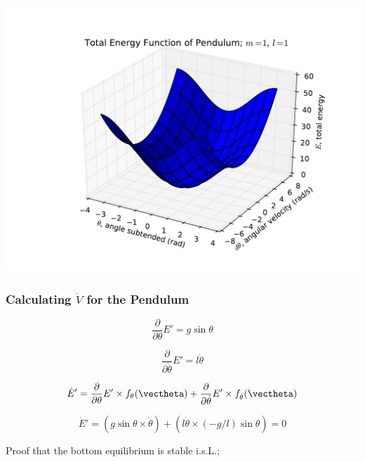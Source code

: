 \documentclass[12pt]{beamer}
\begin{document}
\begin{frame}
\centering
\includegraphics[width=.9\linewidth]{pic/pendulum_energy}
\end{frame}







\begin{frame}
\frametitle{Calculating $\dot V$ for the Pendulum}

\[
\frac{\partial}{\partial\theta} E' = g \sin \theta
\]

\[
\frac{\partial}{\partial\dot\theta} E' = l \dot\theta
\]

\[
\dot E' =
	\frac{\partial}{\partial\theta} E' 
		\times f_{\theta}(\vectheta)
	+ \frac{\partial}{\partial\dot\theta} E'
		\times f_{\dot\theta}(\vectheta)
\]

\[
\dot E' =
	\left( g \sin\theta \times \dot\theta \right)
	+ \left( l \dot\theta \times (-g/l) \sin \theta \right) = 0
\]

\begin{itemize}
\vitem
Proof that the bottom equilibrium is stable i.s.L.;

\end{itemize}

\vfill\null

\end{frame}
\end{document}
